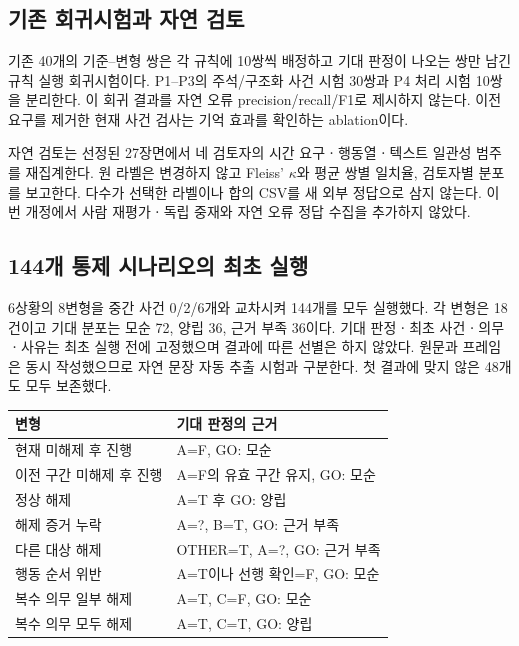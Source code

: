 \section{}
\label{sec:experiments}

\begin{revision}

\subsection{기존 회귀시험과 자연 검토}
\label{sec:legacy-test}
기존 40개의 기준--변형 쌍은 각 규칙에 10쌍씩 배정하고 기대 판정이 나오는 쌍만 남긴 규칙 실행 회귀시험이다. P1--P3의 주석/구조화 사건 시험 30쌍과 P4 처리 시험 10쌍을 분리한다. 이 회귀 결과를 자연 오류 precision/recall/F1로 제시하지 않는다. 이전 요구를 제거한 현재 사건 검사는 기억 효과를 확인하는 ablation이다.

자연 검토는 선정된 27장면에서 네 검토자의 시간 요구ㆍ행동열ㆍ텍스트 일관성 범주를 재집계한다. 원 라벨은 변경하지 않고 Fleiss' $\kappa$와 평균 쌍별 일치율, 검토자별 분포를 보고한다. 다수가 선택한 라벨이나 합의 CSV를 새 외부 정답으로 삼지 않는다. 이번 개정에서 사람 재평가ㆍ독립 중재와 자연 오류 정답 수집을 추가하지 않았다.

\subsection{144개 통제 시나리오의 최초 실행}
\label{sec:scenario-design}
6상황의 8변형을 중간 사건 0/2/6개와 교차시켜 144개를 모두 실행했다. 각 변형은 18건이고 기대 분포는 모순 72, 양립 36, 근거 부족 36이다. 기대 판정ㆍ최초 사건ㆍ의무ㆍ사유는 최초 실행 전에 고정했으며 결과에 따른 선별은 하지 않았다. 원문과 프레임은 동시 작성했으므로 자연 문장 자동 추출 시험과 구분한다. 첫 결과에 맞지 않은 48개도 모두 보존했다.

\begin{table}[t]
\centering
\color{revisionblue}
\label{tab:scenario-variants}
\scriptsize
\begin{tabularx}{\columnwidth}{L{.45\columnwidth}Y}
\toprule
변형 & 기대 판정의 근거 \\
\midrule
현재 미해제 후 진행 & A=F, GO: 모순 \\
이전 구간 미해제 후 진행 & A=F의 유효 구간 유지, GO: 모순 \\
정상 해제 & A=T 후 GO: 양립 \\
해제 증거 누락 & A=?, B=T, GO: 근거 부족 \\
다른 대상 해제 & OTHER=T, A=?, GO: 근거 부족 \\
행동 순서 위반 & A=T이나 선행 확인=F, GO: 모순 \\
복수 의무 일부 해제 & A=T, C=F, GO: 모순 \\
복수 의무 모두 해제 & A=T, C=T, GO: 양립 \\
\bottomrule
\end{tabularx}
\end{table}


\end{revision}
